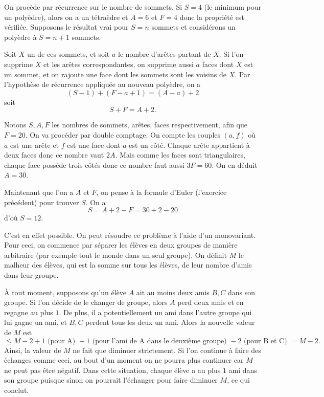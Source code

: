 \begin{sol}
On procède par récurrence sur le nombre de sommets. Si $S=4$ (le minimum pour un polyèdre), alors on a un tétraèdre et $A=6$ et $F=4$ donc la propriété est vérifiée. Supposons le résultat vrai pour $S=n$ sommets et considérons un polyèdre à $S=n+1$ sommets.

Soit $X$ un de ces sommets, et soit $a$ le nombre d'arêtes partant de $X$. Si l'on supprime $X$ et les arêtes correspondantes, on supprime aussi $a$ faces dont $X$ est un sommet, et on rajoute une face dont les sommets sont les voisins de $X$. Par l'hypothèse de récurrence appliquée au nouveau polyèdre, on a
$$(S-1)+(F-a+1) = (A-a)+2$$
soit
$$S+F=A+2.$$
\end{sol}


\begin{sol}
Notons $S,A,F$ les nombres de sommets, arêtes, faces respectivement, afin que $F=20$. On va procéder par double comptage. On compte les couples $(a,f)$ où $a$ est une arête et $f$ est une face dont $a$ est un côté. Chaque arête appartient à deux faces donc ce nombre vaut $2A$. Mais comme les faces sont triangulaires, chaque face possède trois côtés donc ce nombre faut aussi $3F=60$. On en déduit $A=30$.

Maintenant que l'on a $A$ et $F$, on pense à la formule d'Euler (l'exercice précédent) pour trouver $S$. On a
$$S=A+2-F=30+2-20$$
d'où $S=12$.
\end{sol}


\begin{sol}
C'est en effet possible. On peut résoudre ce problème à l'aide d'un monovariant. Pour ceci, on commence par séparer les élèves en deux groupes de manière arbitraire (par exemple tout le monde dans un seul groupe). On définit $M$ le malheur des élèves, qui est la somme sur tous les élèves, de leur nombre d'amis dans leur groupe.

À tout moment, supposons qu'un élève $A$ ait au moins deux amis $B,C$ dans son groupe. Si l'on décide de le changer de groupe, alors $A$ perd deux amis et en regagne au plus $1$. De plus, il a potentiellement un ami dans l'autre groupe qui lui gagne un ami, et $B,C$ perdent tous les deux un ami. Alors la nouvelle valeur de $M$ est
$$\le M -2+1\text{ (pour A) }+1\text{ (pour l'ami de A dans le deuxième groupe) }-2\text{ (pour B et C) }=M-2.$$
Ainsi, la valeur de $M$ ne fait que diminuer strictement. Si l'on continue à faire des échanges comme ceci, au bout d'un moment on ne pourra plus continuer car $M$ ne peut pas être négatif. Dans cette situation, chaque élève a au plus $1$ ami dans son groupe puisque sinon on pourrait l'échanger pour faire diminuer $M$, ce qui conclut.
\end{sol}


